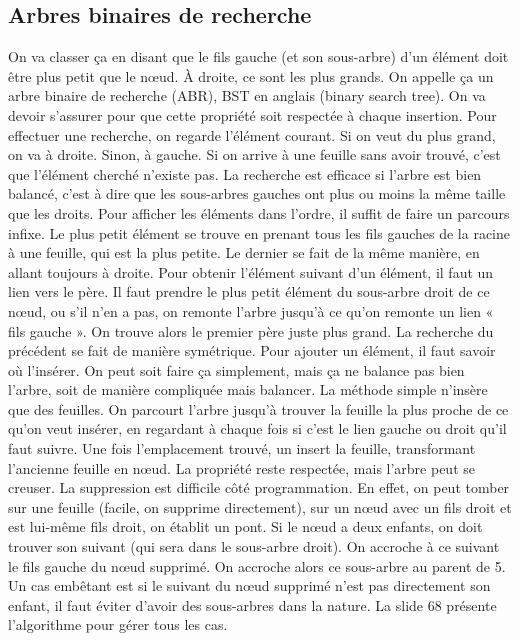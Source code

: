 \documentclass[10pt]{article}
\begin{document}
\subsection{Arbres binaires de recherche}
On va classer ça en disant que le fils gauche (et son sous-arbre) d'un élément doit être plus petit que le nœud. À droite, ce sont les plus grands. On appelle ça un arbre binaire de recherche (ABR), BST en anglais (binary search tree). On va devoir s'assurer pour que cette propriété soit respectée à chaque insertion.  
\newline \newline 
Pour effectuer une recherche, on regarde l'élément courant. Si on veut du plus grand, on va à droite. Sinon, à gauche. Si on arrive à une feuille sans avoir trouvé, c'est que l'élément cherché n'existe pas. La recherche est efficace si l'arbre est bien balancé, c'est à dire que les sous-arbres gauches ont plus ou moins la même taille que les droits. 
\newline \newline 
Pour afficher les éléments dans l'ordre, il suffit de faire un parcours infixe. Le plus petit élément se trouve en prenant tous les fils gauches de la racine à une feuille, qui est la plus petite. Le dernier se fait de la même manière, en allant toujours à droite. 
\newline \newline 
Pour obtenir l'élément suivant d'un élément, il faut un lien vers le père. Il faut prendre le plus petit élément du sous-arbre droit de ce nœud, ou s'il n'en a pas, on remonte l'arbre jusqu'à ce qu'on remonte un lien « fils gauche ». On trouve alors le premier père juste plus grand. La recherche du précédent se fait de manière symétrique. 
\newline \newline 
Pour ajouter un élément, il faut savoir où l'insérer. On peut soit faire ça simplement, mais ça ne balance pas bien l'arbre, soit de manière compliquée mais balancer. La méthode simple n'insère que des feuilles. On parcourt l'arbre jusqu'à trouver la feuille la plus proche de ce qu'on veut insérer, en regardant à chaque fois si c'est le lien gauche ou droit qu'il faut suivre. Une fois l'emplacement trouvé, un insert la feuille, transformant l'ancienne feuille en nœud. La propriété reste respectée, mais l'arbre peut se creuser. 
\newline \newline 
La suppression est difficile côté programmation. En effet, on peut tomber sur une feuille (facile, on supprime directement), sur un nœud avec un fils droit et est lui-même fils droit, on établit un pont. Si le nœud a deux enfants, on doit trouver son suivant (qui sera dans le sous-arbre droit). On accroche à ce suivant le fils gauche du nœud supprimé. On accroche alors ce sous-arbre au parent de 5. Un cas embêtant est si le suivant du nœud supprimé n'est pas directement son enfant, il faut éviter d'avoir des sous-arbres dans la nature. La slide 68 présente l'algorithme pour gérer tous les cas. 
\end{document}
